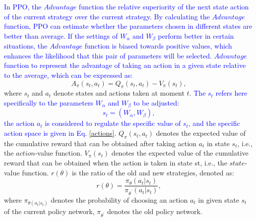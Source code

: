 \documentclass[review]{elsarticle}
\begin{document}
\textcolor{blue}{In PPO, the $Advantage$ function the relative superiority of the next state action of the current strategy over the current strategy. By calculating the $Advantage$ function, PPO can estimate whether the parameters chosen in different states are better than average. If the settings of $W_{\alpha}$ and $W_{\beta}$ perform better in certain situations, the $Advantage$ function is biased towards positive values, which enhances the likelihood that this pair of parameters will be selected. $Advantage$ function to represent the advantage of taking an action in a given state relative to the average, which can be expressed as:}
\begin{equation}
	\label{adv}
	A_{\pi}(s_{t},a_{t})=Q_{\pi}(s_{t},a_{t})-V_{\pi}(s_{t}),
\end{equation}
where $s_{t}$ and $a_{t}$ denote states and actions taken at moment $t$. \textcolor{blue}{The $s_{t}$ refers here specifically to the parameters $W_{\alpha}$ and $W_{\beta}$ to be adjusted:
\begin{equation}
		\label{st}
		s_{t}=(W_{\alpha}, W_{\beta}),
\end{equation}
the action $a_{t}$ is considered to regulate the specific value of $s_{t}$, and the specific action space is given in Eq. \eqref{actions}.}
$Q_{\pi}(s_{t},a_{t})$ denotes the expected value of the cumulative reward that can be obtained after taking action $a_{t}$ in state $s_{t}$, i.e., the $action$-value function. $V_{\pi}(s_{t})$ denotes the expected value of the cumulative reward that can be obtained when the action is taken in state st, i.e., the $state$-value function.
$r(\theta)$ is the ratio of the old and new strategies, denoted as:
\begin{equation}
	\label{oldtheta}
	r(\theta) = \frac{\pi_{\theta}(a_{t}|s_{t})}{\pi_{\theta^{\prime}}(a_{t}|s_{t})},
\end{equation}
where $\pi_{\theta(a_{t}|s_{t})}$ denotes the probability of choosing an action $a_{t}$ in given state $s_{t}$ of the current policy network, $\pi_{\theta^{\prime}}$ denotes the old policy network.
\end{document}
